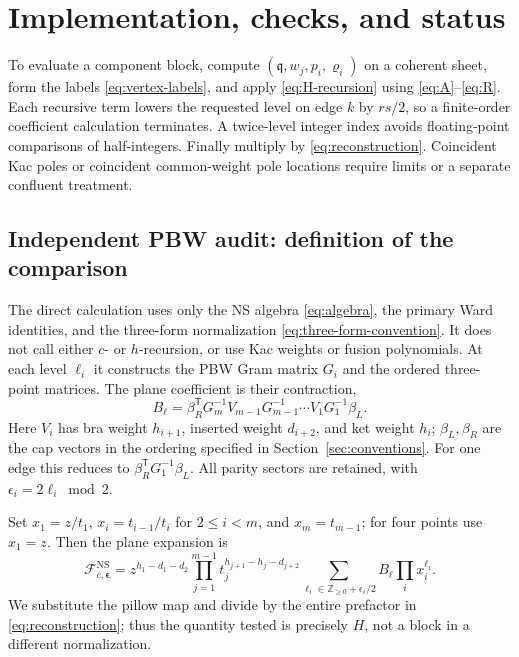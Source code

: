 \documentclass[11pt]{article}
\numberwithin{equation}{section}
\newcommand{\NS}{\mathrm{NS}}
\newcommand{\fq}{\mathfrak q}
\newcommand{\cF}{\mathcal F}
\newcommand{\ve}{\boldsymbol\epsilon}
\begin{document}
\section{Implementation, checks, and status}
\label{sec:checks}

To evaluate a component block, compute $(\fq,w_j,p_i,\varrho_i)$ on a
coherent sheet, form the labels \eqref{eq:vertex-labels}, and apply
\eqref{eq:H-recursion} using \eqref{eq:A}--\eqref{eq:R}. Each recursive
term lowers the requested level on edge $k$ by $rs/2$, so a finite-order
coefficient calculation terminates. A twice-level integer index avoids
floating-point comparisons of half-integers. Finally multiply by
\eqref{eq:reconstruction}. Coincident Kac poles or coincident common-weight
pole locations require limits or a separate confluent treatment.

\subsection{Independent PBW audit: definition of the comparison}

The direct calculation uses only the NS algebra \eqref{eq:algebra}, the
primary Ward identities, and the three-form normalization
\eqref{eq:three-form-convention}. It does not call either $c$- or
$h$-recursion, or use Kac weights or fusion polynomials. At each level
$\ell_i$ it constructs the PBW Gram matrix $G_i$ and the ordered
three-point matrices. The plane coefficient is their contraction,
\begin{equation}
 B_{\boldsymbol\ell}
 =\beta_R^{\mathsf T}G_m^{-1}V_{m-1}G_{m-1}^{-1}\cdots
     V_1G_1^{-1}\beta_L.
 \label{eq:PBW-coefficient}
\end{equation}
Here $V_i$ has bra weight $h_{i+1}$, inserted weight $d_{i+2}$, and
ket weight $h_i$; $\beta_L,\beta_R$ are the cap vectors in the ordering
specified in Section~\ref{sec:conventions}. For one edge this reduces to
$\beta_R^{\mathsf T}G_1^{-1}\beta_L$.
All parity sectors are retained, with $\epsilon_i=2\ell_i\bmod2$.

Set $x_1=z/t_1$, $x_i=t_{i-1}/t_i$ for $2\leq i<m$, and
$x_m=t_{m-1}$; for four points use $x_1=z$. Then the plane expansion is
\begin{equation}
 \cF^{\NS}_{c,\ve}
 =z^{h_1-d_1-d_2}
   \prod_{j=1}^{m-1}t_j^{h_{j+1}-h_j-d_{j+2}}
   \sum_{\ell_i\in\mathbb Z_{\geq0}+\epsilon_i/2}
      B_{\boldsymbol\ell}\prod_i x_i^{\ell_i}.
 \label{eq:PBW-plane-series}
\end{equation}
We substitute the pillow map and divide by the entire prefactor in
\eqref{eq:reconstruction}; thus the quantity tested is precisely $H$,
not a block in a different normalization.
\end{document}
